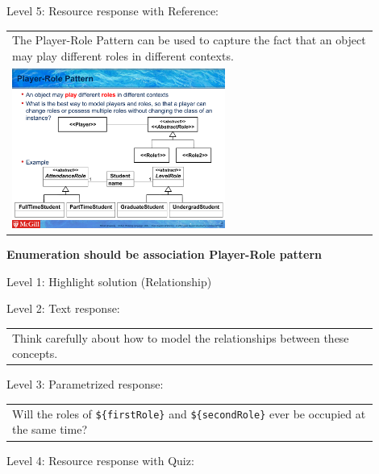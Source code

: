 \noindent Level 5: Resource response with Reference: \medskip

\begin{tabular}{|p{0.9\linewidth}}
The Player-Role Pattern can be used to capture the fact that an object may play different roles
in different contexts.

\\
\includegraphics[width=0.6\textwidth]{images/player_role.png}
\end{tabular} \medskip


\noindent \textbf{Enumeration should be association Player-Role pattern} \medskip

\noindent Level 1: Highlight solution (Relationship) \medskip

\noindent Level 2: Text response: \medskip

\begin{tabular}{|p{0.9\linewidth}}
Think carefully about how to model the relationships between these concepts.
\end{tabular} \medskip

\noindent Level 3: Parametrized response: \medskip

\begin{tabular}{|p{0.9\linewidth}}
Will the roles of \verb|${firstRole}| and \verb|${secondRole}| ever be occupied at the same time?
\end{tabular} \medskip

\noindent Level 4: Resource response with Quiz: \medskip



